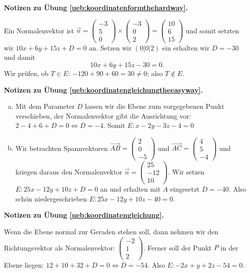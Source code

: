 \documentclass[%
11pt,%
twoside,%
titlepage,%
german,%
headsepline%
]{scrartcl}
\theoremstyle{definition}
\theoremstyle{plain}
\newcommand{\concatueb}[1]{ueb:#1}%
\newcommand{\concatlsg}[1]{lsg:#1}%
\newenvironment{lsg}[1]{%
    \par\noindent\textbf{Notizen zu Übung \ref{\concatueb{#1}}.}%
    \label{\concatlsg{#1}}
}{%
    \par%
}
\begin{document}
\begin{lsg}{koordinatenformthehardway}
Ein Normalenvektor ist $\vec{n}=\begin{pmatrix}
    -3\\5\\0
\end{pmatrix}\times\begin{pmatrix}
    -3\\0\\2
\end{pmatrix}=\begin{pmatrix}
    10\\6\\15
\end{pmatrix}$
und somit setzten wir $10x+6y+15z+D=0$ an. Setzen wir $(0|0|2)$ ein erhalten wir $D=-30$ und damit
$$10x+6y+15z-30=0.$$
Wir prüfen, ob $T\in E$: $-120+90+60=30\neq0$; also $T\not\in E$.
\end{lsg}
\begin{lsg}{koordinatengleichungtheeasyway}
\begin{enumerate}[a)]
    \item Mit dem Parameter $D$ lassen wir die Ebene zum vorgegebenen Punkt verschieben, der Normalenvektor gibt die Ausrichtung vor: $2-4+6+D=0\Leftrightarrow D=-4$. Somit $E:x-2y-3z-4=0$

    \item Wir betrachten Spannvektoren $\vec{AB}=\begin{pmatrix}
        2\\0\\-5
    \end{pmatrix}$ und $\vec{AC}=\begin{pmatrix}
        4\\5\\-4
    \end{pmatrix}$ und kriegen daraus den Normalenvektor $\vec{n}=\begin{pmatrix}
        25\\-12\\10
    \end{pmatrix}$. Wir setzen $E:25x-12y+10z+D=0$ an und erhalten mit $A$ eingesetzt $D=-40$. Also schön niedergeschrieben $E:25x-12y+10z-40=0$.
\end{enumerate}
\end{lsg}
\begin{lsg}{koordinatengleichung}
Wenn die Ebene normal zur Geraden stehen soll, dann nehmen wir den Richtungsvektor als Normalenvektor: $\begin{pmatrix}
    -2\\1\\2
\end{pmatrix}$. Ferner soll der Punkt $P$ in der Ebene liegen: $12+10+32+D=0\Leftrightarrow D=-54$. Also $E: -2x+y+2z-54=0$.
\end{lsg}
\end{document}
